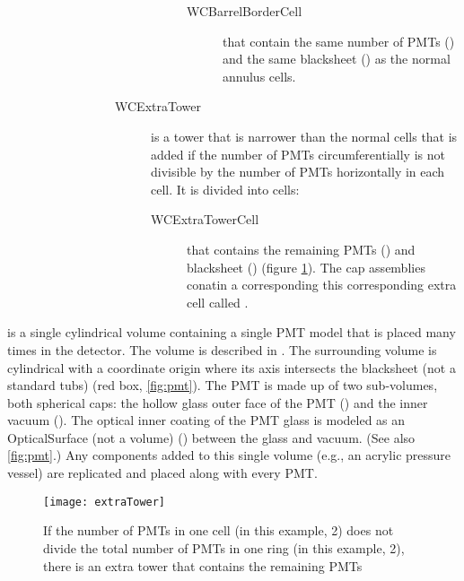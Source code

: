 \begin{description}
\begin{description}
\begin{description}
\begin{description}
\begin{description}
          \begin{description}
            \item[WCBarrelBorderCell] that contain the same number of PMTs () and the same blacksheet () as the normal annulus cells.
          \end{description}
        \end{description}
        \item[WCExtraTower] is a tower that is narrower than the normal cells that is added if the number of PMTs circumferentially is not divisible by the number of PMTs horizontally in each cell.  It is divided into cells:
        \begin{description}
            \item[WCExtraTowerCell] that contains the remaining PMTs () and blacksheet  () (figure \ref{fig:extra}).  The cap assemblies conatin a corresponding this corresponding extra cell called .
        \end{description}
      \end{description}
    \end{description}
  \end{description}
\end{description}      



 is a single cylindrical volume containing a single PMT model that is placed many times in the detector.  The volume is described in .  The surrounding volume is cylindrical with a coordinate origin where its axis intersects the blacksheet (not a standard tubs) (red box, \ref{fig:pmt}).  The PMT is made up of two sub-volumes, both spherical caps: the hollow glass outer face of the PMT () and the inner vacuum ().  The optical inner coating of the PMT glass is modeled as an OpticalSurface (not a volume) () between the glass and vacuum.  (See also \ref{fig:pmt}.)  Any components added to this single volume (e.g., an acrylic pressure vessel) are replicated and placed along with every PMT.


\begin{figure}[p]
   \begin{center}
\texttt{[image: extraTower]} 
  \end{center}
\caption{If the number of PMTs in one cell (in this example, 2) does not divide the total number of PMTs in one ring (in this example, 2), there is an extra tower that contains the remaining PMTs}\label{fig:extra}
\end{figure}

